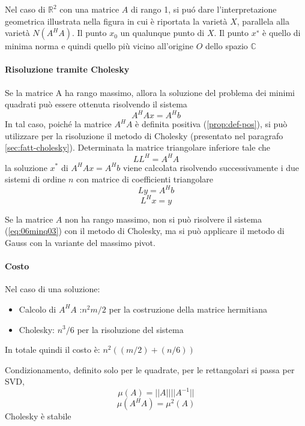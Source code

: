 \begin{thproof}
\begin{enumerate}
  Nel caso di $\mathbb{R}^2$ con una matrice $A$ di rango 1, si pu\'o
  dare l’interpretazione geometrica illustrata nella figura in cui \`e
  riportata la variet\`a $X$, parallela alla variet\`a $N (A^H A)$.  Il
  punto $x_0$ un qualunque punto di $X$. Il punto $x^∗$ \`e quello di
  minima norma e quindi quello pi\`u vicino all’origine $O$ dello spazio
  $\mathbb{C}$
\end{enumerate}
\end{thproof}

\paragraph{Risoluzione tramite Cholesky} 
Se la matrice A ha rango massimo, allora la soluzione del problema dei
minimi quadrati pu\`o essere ottenuta risolvendo il sistema
$$A^{H}Ax = A^{H}b$$
In tal caso, poich\'e la matrice $A^{H}{A}$ \`e definita positiva
(\ref{prop:def-pos}), si pu\`o utilizzare per la risoluzione il metodo
di Cholesky (presentato nel paragrafo \ref{sec:fatt-cholesky}).
Determinata la matrice triangolare inferiore tale che
$$LL^{H} =A^{H} A$$
la soluzione $x^{*}$ di $A^{H}Ax = A^{H}b$ viene calcolata risolvendo
successivamente i due sistemi di ordine $n$ con matrice di
coefficienti triangolare
$$Ly = A^H b$$
$$L^H x = y$$

Se la matrice $A$ non ha rango massimo, non si pu\`o risolvere il 
sistema 
(\ref{eq:06minq03}) con il metodo di Cholesky, ma si pu\`o
 applicare il metodo di Gauss con la variante del massimo pivot.

\paragraph{Costo}
Nel caso di una soluzione:
\begin{itemize}
\item Calcolo di $A^{H}A$ :$ n^{2}m/2$ per la costruzione della
matrice hermitiana
\item Cholesky: $n^{3}/6$ per la risoluzione del sistema
\end{itemize} In totale quindi il costo \`e: $n^{2}((m/2) + (n/6))$

\begin{workinprogress} 
Condizionamento, definito solo per le quadrate,
per le rettangolari si passa per SVD,
$$ \mu(A) = ||A|| ||A^{-1}||$$
$$  \mu(A^{H}A) = \mu^{2}(A)$$
Cholesky è stabile
\end{workinprogress}

